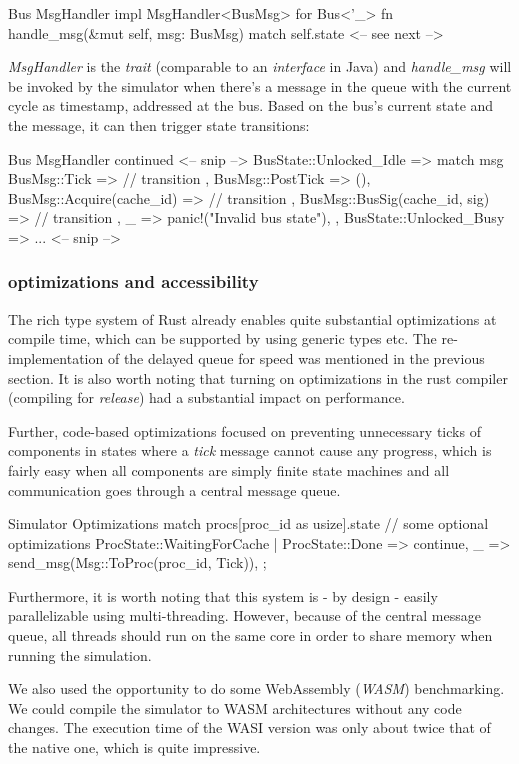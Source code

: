 \documentclass{article}
\begin{document}
\begin{multicols}{2}
\begin{code}[Rust]{Bus MsgHandler}
impl MsgHandler<BusMsg> for Bus<'_> {
    fn handle_msg(&mut self, msg: BusMsg) {
        match self.state {
            <-- see next -->
        }
    }
}
\end{code}

\textit{MsgHandler} is the \textit{trait} (comparable to an \textit{interface} in Java) and \textit{handle\_msg} will be invoked by the simulator when there's a message in the queue with the current cycle as timestamp, addressed at the bus. Based on the bus's current state and the message, it can then trigger state transitions:

\begin{code}[Rust]{Bus MsgHandler continued}
<-- snip -->
BusState::Unlocked_Idle => {
    match msg {
        BusMsg::Tick => {
            // transition
        },
        BusMsg::PostTick => (),
        BusMsg::Acquire(cache_id) => {
            // transition
        },
        BusMsg::BusSig(cache_id, sig) => {
            // transition
        },
        _ => panic!("Invalid bus state"),
    }
},
BusState::Unlocked_Busy => ...
<-- snip -->
\end{code}

\subsubsection{optimizations and accessibility}

The rich type system of Rust already enables quite substantial optimizations at compile time, which can be supported by using generic types etc. The re-implementation of the delayed queue for speed was mentioned in the previous section. It is also worth noting that turning on optimizations in the rust compiler (compiling for \textit{release}) had a substantial impact on performance.

Further, code-based optimizations focused on preventing unnecessary ticks of components in states where a \textit{tick} message cannot cause any progress, which is fairly easy when all components are simply finite state machines and all communication goes through a central message queue.

\begin{code}[Rust]{Simulator Optimizations}
match procs[proc_id as usize].state {
    // some optional optimizations
    ProcState::WaitingForCache | ProcState::Done => continue,
    _ => send_msg(Msg::ToProc(proc_id, Tick)),
};
\end{code}

Furthermore, it is worth noting that this system is - by design - easily parallelizable using multi-threading. However, because of the central message queue, all threads should run on the same core in order to share memory when running the simulation.

We also used the opportunity to do some WebAssembly (\textit{WASM}) benchmarking. We could compile the simulator to WASM architectures without any code changes. The execution time of the WASI version was only about twice that of the native one, which is quite impressive.

\end{multicols}
\end{document}

